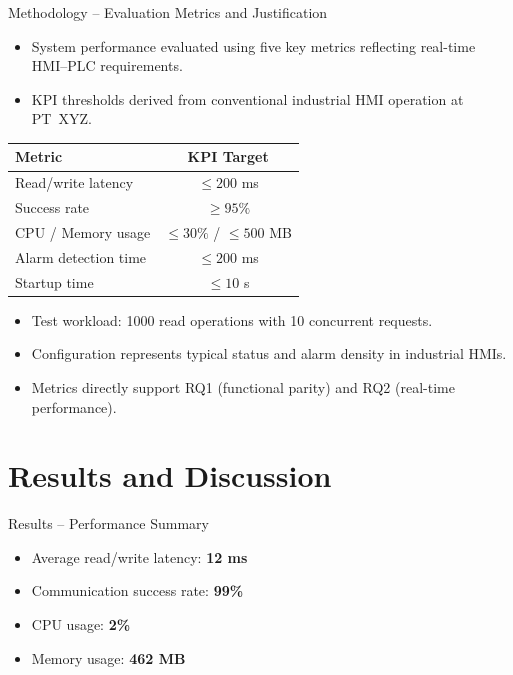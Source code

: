 \documentclass[aspectratio=169]{beamer}
\begin{document}
\begin{frame}{Methodology -- Evaluation Metrics and Justification}
\small
\begin{itemize}
  \item System performance evaluated using five key metrics reflecting real-time HMI--PLC requirements.
  \item KPI thresholds derived from conventional industrial HMI operation at PT~XYZ.
\end{itemize}

\vspace{0.2cm}
\centering
\begin{tabular}{|l|c|}
\hline
\textbf{Metric} & \textbf{KPI Target} \\ \hline
Read/write latency & $\leq 200$ ms \\ \hline
Success rate & $\geq 95\%$ \\ \hline
CPU / Memory usage & $\leq 30\%$ / $\leq 500$ MB \\ \hline
Alarm detection time & $\leq 200$ ms \\ \hline
Startup time & $\leq 10$ s \\ \hline
\end{tabular}

\vspace{0.2cm}
\begin{itemize}
  \item Test workload: 1000 read operations with 10 concurrent requests.
  \item Configuration represents typical status and alarm density in industrial HMIs.
  \item Metrics directly support RQ1 (functional parity) and RQ2 (real-time performance).
\end{itemize}
\end{frame}


\section{Results and Discussion}

\begin{frame}{Results -- Performance Summary}
\begin{itemize}
  \item Average read/write latency: \textbf{12 ms}
  \item Communication success rate: \textbf{99\%}
  \item CPU usage: \textbf{2\%}
  \item Memory usage: \textbf{462 MB}
\end{itemize}
\end{frame}
\end{document}

